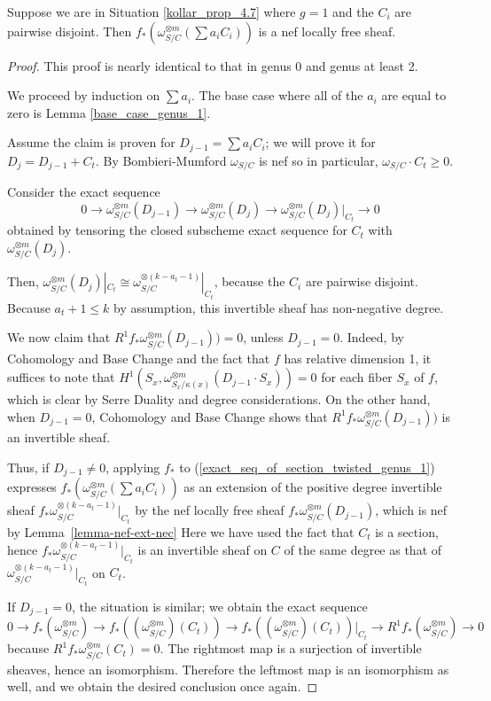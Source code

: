\begin{lemma}\label{inductive_step_genus_1}
Suppose we are in Situation \ref{kollar_prop_4.7} where $g=1$ and the $C_i$ are pairwise disjoint.
Then $f_{*}(\omega_{S/C}^{\otimes m}(\sum a_iC_i))$ is a nef locally free sheaf.
\end{lemma}
\begin{proof}
This proof is nearly identical to that in genus 0 and genus at least 2.

We proceed by induction on $\sum a_i$.
The base case where all of the $a_i$ are equal to zero is Lemma \ref{base_case_genus_1}.

Assume the claim is proven for $D_{j-1}=\sum a_iC_i$; we will prove it for
$D_{j}=D_{j-1}+C_t$.
By Bombieri-Mumford $\omega_{S/C}$ is nef so in particular,
$\omega_{S/C}\cdot C_t\ge0$.

Consider the exact sequence
\begin{equation}\label{exact_seq_of_section_twisted_genus_1}
0\to\omega_{S/C}^{\otimes m}(D_{j-1})\to\omega_{S/C}^{\otimes m}(D_j)\to \omega_{S/C}^{\otimes m}(D_j)|_{C_t}\to0
\end{equation}
obtained by tensoring the closed subscheme exact sequence for $C_t$ with $\omega_{S/C}^{\otimes m}(D_j)$.

Then, $\omega_{S/C}^{\otimes m}(D_j)|_{C_t}\cong \omega_{S/C}^{\otimes (k-a_{t}-1)}|_{C_t}$, because the $C_i$ are pairwise disjoint.
Because $a_{t}+1\le k$ by assumption, this invertible sheaf has non-negative degree.

We now claim that $R^{1}f_{*}\omega_{S/C}^{\otimes m}(D_{j-1}))=0$, unless $D_{j-1}=0$.
Indeed, by Cohomology and Base Change and the fact that $f$ has relative dimension 1, it suffices to note that $H^{1}(S_x,\omega_{S_x/\kappa(x)}^{\otimes m}(D_{j-1}\cdot S_x))=0$ for each fiber $S_x$ of $f$, which is clear by Serre Duality and degree considerations.
On the other hand, when $D_{j-1}=0$, Cohomology and Base Change shows that $R^{1}f_{*}\omega_{S/C}^{\otimes m}(D_{j-1}))$ is an invertible sheaf.


Thus, if $D_{j-1}\neq0$, applying $f_{*}$ to
(\ref{exact_seq_of_section_twisted_genus_1}) expresses
$f_{*}(\omega_{S/C}^{\otimes m}(\sum a_iC_i))$ as an extension of the positive
degree invertible sheaf $f_{*}\omega_{S/C}^{\otimes (k-a_{t}-1)}|_{C_t}$ by the
nef locally free sheaf $f_*\omega_{S/C}^{\otimes m}(D_{j-1})$, which is nef
by Lemma~\ref{lemma-nef-ext-nec}
Here we have used the fact that $C_t$ is a section, hence
$f_{*}\omega_{S/C}^{\otimes (k-a_{t}-1)}|_{C_t}$ is an invertible sheaf on $C$
of the same degree as that of $\omega_{S/C}^{\otimes (k-a_{t}-1)}|_{C_t}$ on
$C_t$.

If $D_{j-1}=0$, the situation is similar; we obtain the exact sequence
$$
0 \to f_{*}(\omega_{S/C}^{\otimes m})\to f_{*}((\omega_{S/C}^{\otimes m})(C_t))\to f_{*}((\omega_{S/C}^{\otimes m})(C_t))|_{C_t}\to R^{1}f_{*}(\omega_{S/C}^{\otimes m})\to0
$$
because $R^{1}f_{*}\omega_{S/C}^{\otimes m}(C_t)=0$.
The rightmost map is a surjection of invertible sheaves, hence an isomorphism.
Therefore the leftmost map is an isomorphism as well, and we obtain the desired conclusion once again.
\end{proof}



